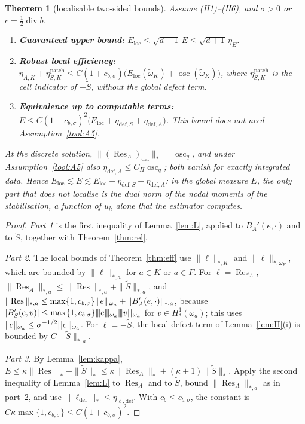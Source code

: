 \documentclass[11pt]{article}
\newcommand{\tnorm}[1]{\lvert\kern-0.25ex\lvert\kern-0.25ex\lvert #1\rvert\kern-0.25ex\rvert\kern-0.25ex\rvert}
\newcommand{\Res}{\operatorname{Res}}
\newcommand{\osc}{\operatorname{osc}}
\newcommand{\Stil}{\tilde S}
\newcommand{\dv}{\operatorname{div}}
\newcommand{\defe}{\mathrm{def}}
\theoremstyle{plain}
\newtheorem{theorem}{Theorem}[section]
\theoremstyle{remark}
\numberwithin{equation}{section}
\begin{document}
\begin{theorem}[localisable two-sided bounds]\label{thm:loc}
Assume (H1)--(H6), and $\sigma>0$ or $c=\frac12\dv b$.
\begin{enumerate}
  \item \textbf{Guaranteed upper bound:} $E_{\mathrm{loc}}\le\sqrt{d+1}\,E\le\sqrt{d+1}\,\eta_E$.
  \item \textbf{Robust local efficiency:}
  $\eta_{A,K}+\eta^{\mathrm{patch}}_{S,K}\le C(1+c_{b,\sigma})\bigl(E_{\mathrm{loc}}(\tilde\omega_K)+\osc(\tilde\omega_K)\bigr)$,
  where $\eta^{\mathrm{patch}}_{S,K}$ is the cell indicator of $-\Stil$, without the global defect
  term.
  \item \textbf{Equivalence up to computable terms:}
  $E\le C(1+c_{b,\sigma})^2\bigl(E_{\mathrm{loc}}+\eta_{\defe,S}+\eta_{\defe,A}\bigr)$. This bound
  does not need Assumption~\ref{tool:A5}.
\end{enumerate}
At the discrete solution, $\|(\Res_A)_\defe\|_*=\osc_q$, and under Assumption~\ref{tool:A5} also
$\eta_{\defe,A}\le C_\Pi\osc_q$; both vanish for exactly integrated data. Hence
$E_{\mathrm{loc}}\lesssim E\lesssim E_{\mathrm{loc}}+\eta_{\defe,S}+\eta_{\defe,A}$: in the global
measure $E$, the only part that does not localise is the dual norm of the nodal moments of the
stabilisation, a function of $u_h$ alone that the estimator computes.
\end{theorem}

\begin{proof}
\emph{Part 1} is the first inequality of Lemma~\ref{lem:L}, applied to $B_A'(e,\cdot)$ and to
$\Stil$, together with Theorem~\ref{thm:rel}.

\emph{Part 2.} The local bounds of Theorem~\ref{thm:eff} use $\|\ell\|_{*,K}$ and
$\|\ell\|_{*,\omega_F}$, which are bounded by $\|\ell\|_{*,a}$ for $a\in K$ or $a\in F$. For
$\ell=\Res_A$, $\|\Res_A\|_{*,a}\le\|\Res\|_{*,a}+\|\Stil\|_{*,a}$, and
$\|\Res\|_{*,a}\le\max\{1,c_{b,\sigma}\}\tnorm{e}_{\omega_a}+\|B_A'(e,\cdot)\|_{*,a}$, because
$|B_S'(e,v)|\le\max\{1,c_{b,\sigma}\}\tnorm{e}_{\omega_a}\tnorm{v}_{\omega_a}$ for
$v\in H^1_*(\omega_a)$; this uses $\|e\|_{\omega_a}\le\sigma^{-1/2}\tnorm{e}_{\omega_a}$. For
$\ell=-\Stil$, the local defect term of Lemma~\ref{lem:H}(i) is bounded by $C\|\Stil\|_{*,a}$.

\emph{Part 3.} By Lemma~\ref{lem:kappa},
$E\le\kappa\|\Res\|_*+\|\Stil\|_*\le\kappa\|\Res_A\|_*+(\kappa+1)\|\Stil\|_*$. Apply the second
inequality of Lemma~\ref{lem:L} to $\Res_A$ and to $\Stil$, bound $\|\Res_A\|_{*,a}$ as in part~2,
and use $\|\ell_\defe\|_*\le\eta_{\ell,\defe}$. With $c_b\le c_{b,\sigma}$, the constant is
$C\kappa\max\{1,c_{b,\sigma}\}\le C(1+c_{b,\sigma})^2$.
\end{proof}
\end{document}
